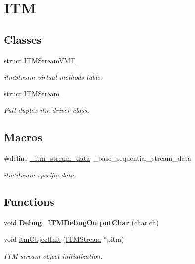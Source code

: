 \hypertarget{group__ITM}{\section{I\+T\+M}
\label{group__ITM}
}
\subsection*{Classes}
\begin{DoxyCompactItemize}
\item 
struct \hyperlink{structITMStreamVMT}{I\+T\+M\+Stream\+V\+M\+T}
\begin{DoxyCompactList}\small\item\em {\ttfamily itm\+Stream} virtual methods table. \end{DoxyCompactList}\item 
struct \hyperlink{structITMStream}{I\+T\+M\+Stream}
\begin{DoxyCompactList}\small\item\em Full duplex itm driver class. \end{DoxyCompactList}\end{DoxyCompactItemize}
\subsection*{Macros}
\begin{DoxyCompactItemize}
\item 
\hypertarget{group__ITM_ga2499678d2188c663196fecc40bd35483}{\#define \hyperlink{group__ITM_ga2499678d2188c663196fecc40bd35483}{\+\_\+itm\+\_\+stream\+\_\+data}~\+\_\+base\+\_\+sequential\+\_\+stream\+\_\+data}\label{group__ITM_ga2499678d2188c663196fecc40bd35483}

\begin{DoxyCompactList}\small\item\em {\ttfamily itm\+Stream} specific data. \end{DoxyCompactList}\end{DoxyCompactItemize}
\subsection*{Functions}
\begin{DoxyCompactItemize}
\item 
\hypertarget{group__ITM_gafc909eadbc17807bfc2c95d22988e396}{void {\bfseries Debug\+\_\+\+I\+T\+M\+Debug\+Output\+Char} (char ch)}\label{group__ITM_gafc909eadbc17807bfc2c95d22988e396}

\item 
void \hyperlink{group__ITM_gab43f2808bf17b6e393e95faee2abd058}{itm\+Object\+Init} (\hyperlink{structITMStream}{I\+T\+M\+Stream} $\ast$pitm)
\begin{DoxyCompactList}\small\item\em I\+T\+M stream object initialization. \end{DoxyCompactList}\end{DoxyCompactItemize}


